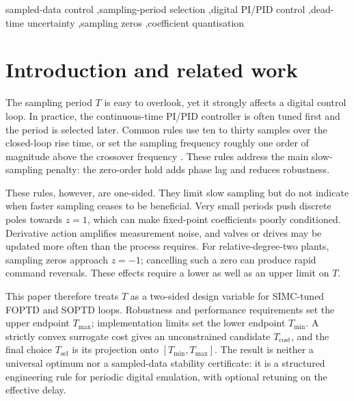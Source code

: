 \documentclass[a4paper,fleqn]{cas-sc}
\theoremstyle{remark}
\newcommand{\Tmin}{T_{\min}}
\newcommand{\Tmax}{T_{\max}}
\newcommand{\Tcost}{T_{\mathrm{cost}}}
\newcommand{\Tsel}{T_{\mathrm{sel}}}
\begin{document}
\begin{keywords}
sampled-data control \sep sampling-period selection \sep digital PI/PID control \sep dead-time uncertainty \sep sampling zeros \sep coefficient quantisation
\end{keywords}

\maketitle

\section{Introduction and related work}
\label{sec:intro}
The sampling period $T$ is easy to overlook, yet it strongly affects a digital control loop. In practice, the continuous-time PI/PID controller is often tuned first and the period is selected later. Common rules use ten to thirty samples over the closed-loop rise time, or set the sampling frequency roughly one order of magnitude above the crossover frequency \citep{astrom1997computer,franklin1998digital,isermann1989digital}. These rules address the main slow-sampling penalty: the zero-order hold adds phase lag and reduces robustness.

These rules, however, are one-sided. They limit slow sampling but do not indicate when faster sampling ceases to be beneficial. Very small periods push discrete poles towards $z=1$, which can make fixed-point coefficients poorly conditioned. Derivative action amplifies measurement noise, and valves or drives may be updated more often than the process requires. For relative-degree-two plants, sampling zeros approach $z=-1$; cancelling such a zero can produce rapid command reversals. These effects require a lower as well as an upper limit on $T$.

This paper therefore treats $T$ as a two-sided design variable for SIMC-tuned FOPTD and SOPTD loops. Robustness and performance requirements set the upper endpoint $\Tmax$; implementation limits set the lower endpoint $\Tmin$. A strictly convex surrogate cost gives an unconstrained candidate $\Tcost$, and the final choice $\Tsel$ is its projection onto $[\Tmin,\Tmax]$. The result is neither a universal optimum nor a sampled-data stability certificate: it is a structured engineering rule for periodic digital emulation, with optional retuning on the effective delay.
\end{document}
